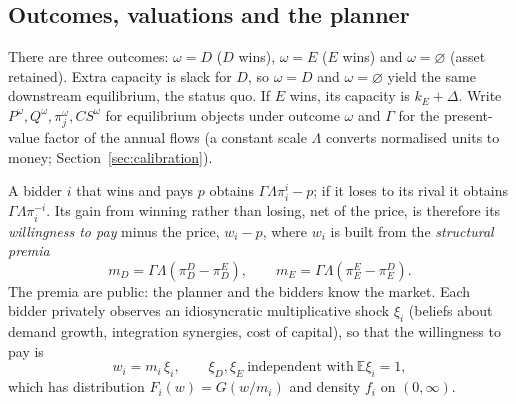 \documentclass[12pt,a4paper]{article}
\theoremstyle{definition}
\theoremstyle{remark}
\newcommand{\E}{\mathbb{E}}
\begin{document}
\subsection{Outcomes, valuations and the planner}

There are three outcomes: $\omega=D$ ($D$ wins), $\omega=E$ ($E$ wins) and $\omega=\varnothing$ (asset retained). Extra capacity is slack for $D$, so $\omega=D$ and $\omega=\varnothing$ yield the same downstream equilibrium, the status quo. If $E$ wins, its capacity is $k_E+\Delta$. Write $P^\omega,Q^\omega,\pi_j^\omega,CS^\omega$ for equilibrium objects under outcome $\omega$ and $\Gamma$ for the present-value factor of the annual flows (a constant scale $\Lambda$ converts normalised units to money; Section~\ref{sec:calibration}).

A bidder $i$ that wins and pays $p$ obtains $\Gamma\Lambda\pi_i^{i}-p$; if it loses to its rival it obtains $\Gamma\Lambda\pi_i^{-i}$. Its gain from winning rather than losing, net of the price, is therefore its \emph{willingness to pay} minus the price, $w_i-p$, where $w_i$ is built from the \emph{structural premia}
\begin{equation}\label{eq:w}
m_D=\Gamma\Lambda(\pi_D^D-\pi_D^E),\qquad m_E=\Gamma\Lambda(\pi_E^E-\pi_E^D).
\end{equation}
The premia are public: the planner and the bidders know the market. Each bidder privately observes an idiosyncratic multiplicative shock $\xi_i$ (beliefs about demand growth, integration synergies, cost of capital), so that the willingness to pay is
\begin{equation}\label{eq:wxi}
w_i=m_i\,\xi_i,\qquad \xi_D,\xi_E\ \text{independent with}\ \E\xi_i=1,
\end{equation}
which has distribution $F_i(w)=G(w/m_i)$ and density $f_i$ on $(0,\infty)$.
\end{document}
